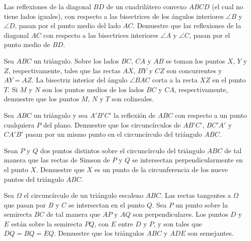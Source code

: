 
\begin{probEG}
  Las reflexiones de la diagonal $BD$ de un cuadrilátero convexo $ABCD$ (el cual
  no tiene lados iguales), con respecto a las bisectrices de los ángulos
  interiores $\angle B$ y $\angle D$, pasan por el punto medio del lado $AC$.
  Demuestre que las reflexiones de la diagonal $AC$ con respecto a las
  bisectrices interiores $\angle A$ y $\angle C$, pasan por el punto medio de
  $BD$.
\end{probEG}

\begin{probEG}
  Sea $ABC$ un triángulo. Sobre los lados $BC$, $CA$ y $AB$ se toman los puntos
  $X$, $Y$ y $Z$, respectivamente, tales que las rectas $AX$, $BY$ y $CZ$ son
  concurrentes y $AY=AZ$. La bisectriz interior del ángulo $\angle BAC$ corta a
  la recta $XZ$ en el punto $T$. Si $M$ y $N$ son los puntos medios de los lados
  $BC$ y $CA$, respectivamente, demuestre que los puntos $M$, $N$ y $T$ son
  colineales.
\end{probEG}

\begin{probEG}
  Sea $ABC$ un triángulo y sea $A'B'C'$ la reflexión de $ABC$ con respecto a un
  punto cualquiera $P$ del plano. Demuestre que los circuncírculos de $AB'C'$,
  $BC'A'$ y $CA'B'$ pasan por un mismo punto en el circuncírculo del triángulo
  $ABC$.
\end{probEG}

\begin{probEG}
  Sean $P$ y $Q$ dos puntos distintos sobre el circuncírculo del triángulo $ABC$
  de tal manera que las rectas de Simson de $P$ y $Q$ se intersectan
  perpendicularmente en el punto $X$. Demuestre que $X$ es un punto de la
  circunferencia de los nueve puntos del triángulo $ABC$.
\end{probEG}

\begin{probEG}
  Sea $\Omega$ el circuncírculo de un triángulo escaleno $ABC$. Las rectas
  tangentes a $\Omega$ que pasan por $B$ y $C$ se intersectan en el punto $Q$.
  Sea $P$ un punto sobre la semirecta $BC$ de tal manera que $AP$ y $AQ$ son
  perpendiculares. Los puntos $D$ y $E$ están sobre la semirecta $PQ$, con $E$
  entre $D$ y $P$, y son tales que $DQ=BQ=EQ$. Demuestre que los triángulos
  $ABC$ y $ADE$ son semejantes.
\end{probEG}

